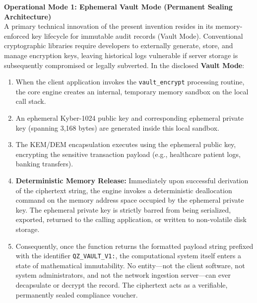 \documentclass[12pt, a4paper]{article}
\begin{document}
\vspace{0.5em}
\noindent \textbf{Operational Mode 1: Ephemeral Vault Mode (Permanent Sealing Architecture)} \\
A primary technical innovation of the present invention resides in its memory-enforced key lifecycle for immutable audit records (Vault Mode). Conventional cryptographic libraries require developers to externally generate, store, and manage encryption keys, leaving historical logs vulnerable if server storage is subsequently compromised or legally subverted.
In the disclosed \textbf{Vault Mode}:
\begin{enumerate}
    \item When the client application invokes the \texttt{vault\_encrypt} processing routine, the core engine creates an internal, temporary memory sandbox on the local call stack.
    \item An ephemeral Kyber-1024 public key and corresponding ephemeral private key (spanning 3,168 bytes) are generated inside this local sandbox.
    \item The KEM/DEM encapsulation executes using the ephemeral public key, encrypting the sensitive transaction payload (e.g., healthcare patient logs, banking transfers).
    \item \textbf{Deterministic Memory Release:} Immediately upon successful derivation of the ciphertext string, the engine invokes a deterministic deallocation command on the memory address space occupied by the ephemeral private key. The ephemeral private key is strictly barred from being serialized, exported, returned to the calling application, or written to non-volatile disk storage.
    \item Consequently, once the function returns the formatted payload string prefixed with the identifier \texttt{QZ\_VAULT\_V1:}, the computational system itself enters a state of mathematical immutability. No entity—not the client software, not system administrators, and not the network ingestion server—can ever decapsulate or decrypt the record. The ciphertext acts as a verifiable, permanently sealed compliance voucher.
\end{enumerate}
\end{document}
